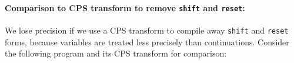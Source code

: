 \paragraph{Comparison to CPS transform to remove {\tt shift} and {\tt reset}:}{
We lose precision if we use a CPS transform to compile away {\tt shift} and {\tt reset} forms, because variables are treated less precisely than continuations.
Consider the following program and its CPS transform for comparison:
\begin{small}
\begin{SCodeFlow}\begin{RktBlk}\begin{SingleColumn}\RktPn{(}\mbox{}\RktPn{(}\RktPn{[}\mbox{}\RktPn{(}\RktSym{}\mbox{}\RktPn{(}\RktPn{)}\mbox{}\RktPn{)}\RktPn{]}

\mbox{}\RktPn{[}\mbox{}\RktPn{(}\RktSym{}\mbox{}\RktPn{(}\RktPn{)}\mbox{}\RktPn{(}\mbox{}\mbox{}\RktPn{(}\mbox{}\RktPn{(}\mbox{}\RktPn{)}\RktPn{)}\RktPn{)}\RktPn{)}\RktPn{]}

\mbox{}\RktPn{[}\mbox{}\RktPn{(}\RktSym{}\mbox{}\RktPn{(}\RktPn{)}\mbox{}\RktPn{(}\mbox{}\RktPn{(}\mbox{}\RktPn{(}\mbox{}\RktPn{)}\RktPn{)}\RktPn{)}\RktPn{)}\RktPn{]}\RktPn{)}

\mbox{}\RktPn{(}\RktSym{}\mbox{}\RktPn{(}\mbox{}\RktPn{)}\mbox{}\RktPn{(}\mbox{}\RktPn{)}\RktPn{)}\RktPn{)}\end{SingleColumn}\end{RktBlk}\end{SCodeFlow}

\begin{SCodeFlow}\begin{RktBlk}\begin{SingleColumn}\RktPn{(}\mbox{}\RktPn{(}\RktPn{[}\mbox{}\RktPn{(}\RktSym{}\mbox{}\RktPn{(}\mbox{}\RktPn{)}\mbox{}\RktPn{(}\mbox{}\RktPn{)}\RktPn{)}\RktPn{]}


\end{SingleColumn}
\end{RktBlk}
\end{SCodeFlow}
\end{small}}
